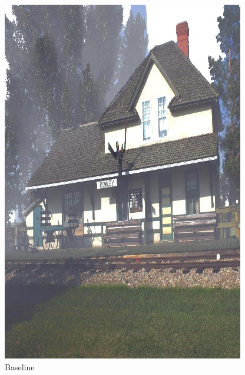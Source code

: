 \documentclass[12pt]{article}
\begin{document}
\begin{figure}[!h]
\begin{minipage}[t]{0.24\linewidth}
        \includegraphics[width=0.9\linewidth]{sample_pictures/after_HazeRD_Baseline.jpg}
        \caption*{Baseline}
    \end{minipage}
    \begin{minipage}[t]{0.24\linewidth}
        \centering

\end{minipage}
\end{figure}
\end{document}
